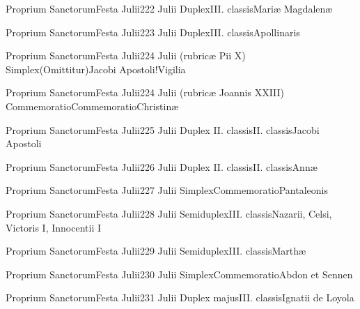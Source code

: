 \documentclass[invitatoriale-romanum.tex]{subfiles}
\begin{document}
	{Proprium Sanctorum}{Festa Julii}{2}{22 Julii}
	{Duplex}{III. classis}{Mariæ Magdalenæ}
	{}
	{}

	{Proprium Sanctorum}{Festa Julii}{2}{23 Julii}
	{Duplex}{III. classis}{Apollinaris}
	{}
	{}

	{Proprium Sanctorum}{Festa Julii}{2}{24 Julii (rubricæ Pii X)}
	{Simplex}{(Omittitur)}{Jacobi Apostoli!Vigilia}
	{}
	{}
\invitferia

	{Proprium Sanctorum}{Festa Julii}{2}{24 Julii (rubricæ Joannis XXIII)}
	{Commemoratio}{Commemoratio}{Christinæ}
	{}
	{}
\invitferia

	{Proprium Sanctorum}{Festa Julii}{2}{25 Julii}
	{Duplex II. classis}{II. classis}{Jacobi Apostoli}
	{}
	{}

	{Proprium Sanctorum}{Festa Julii}{2}{26 Julii}
	{Duplex II. classis}{II. classis}{Annæ}
	{}
	{}

	{Proprium Sanctorum}{Festa Julii}{2}{27 Julii}
	{Simplex}{Commemoratio}{Pantaleonis}
	{}
	{\invitferia}


	{Proprium Sanctorum}{Festa Julii}{2}{28 Julii}
	{Semiduplex}{III. classis}{Nazarii, Celsi, Victoris I, Innocentii I}
	{}
	{}

	{Proprium Sanctorum}{Festa Julii}{2}{29 Julii}
	{Semiduplex}{III. classis}{Marthæ}
	{}
	{}

	{Proprium Sanctorum}{Festa Julii}{2}{30 Julii}
	{Simplex}{Commemoratio}{Abdon et Sennen}
	{}
	{\invitferia}

	{Proprium Sanctorum}{Festa Julii}{2}{31 Julii}
	{Duplex majus}{III. classis}{Ignatii de Loyola}
	{}
	{}

\end{document}
